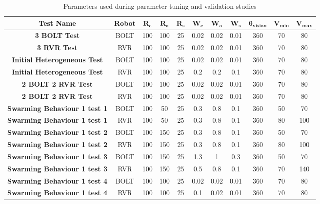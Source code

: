 \documentclass[conference]{IEEEtran}
\begin{document}
\begin{table} [htbp]
    \centering
    \caption{Parameters used during parameter tuning and validation studies}
    \begin{tabular}{|c|c|c|c|c|c|c|c|c|c|c|}
    \hline
        \textbf{Test Name} & \textbf{Robot} & $\mathbf{R_c}$ & $\mathbf{R_a}$ & $\mathbf{R_s}$ & $\mathbf{W_c}$ & $\mathbf{W_a}$ & $\mathbf{W_s}$ & $\mathbf{\theta_{vision}}$ & $\mathbf{V_{min}}$ & $\mathbf{V_{max}}$ \\ \hline
        \textbf{3 BOLT Test} & BOLT & 100 & 100 & 25 & 0.02 & 0.02 & 0.01 & 360 & 70 & 80 \\ \hline
        \textbf{3 RVR Test} & RVR & 100 & 100 & 25 & 0.02 & 0.02 & 0.01 & 360 & 70 & 80 \\ \hline
        \textbf{Initial Heterogeneous Test} & BOLT & 100 & 100 & 25 & 0.02 & 0.02 & 0.01 & 360 & 70 & 80 \\ \hline
        \textbf{Initial Heterogeneous Test} & RVR & 100 & 100 & 25 & 0.2 & 0.2 & 0.1 & 360 & 70 & 80 \\ \hline
        \textbf{2 BOLT 2 RVR Test} & BOLT & 100 & 100 & 25 & 0.02 & 0.02 & 0.01 & 360 & 70 & 80 \\ \hline
        \textbf{2 BOLT 2 RVR Test} & RVR & 100 & 100 & 25 & 0.02 & 0.02 & 0.01 & 360 & 70 & 80\\ \hline
        \textbf{Swarming Behaviour 1 test 1} & BOLT & 100 & 50 & 25 & 0.3 & 0.8 & 0.1 & 360 & 50 & 70 \\ \hline
        \textbf{Swarming Behaviour 1 test 1} & RVR & 100 & 50 & 25 & 0.3 & 0.8 & 0.1 & 360 & 80 & 100\\ \hline
        \textbf{Swarming Behaviour 1 test 2} & BOLT & 100 & 150 & 25 & 0.3 & 0.8 & 0.1 & 360 & 50 & 70\\ \hline
        \textbf{Swarming Behaviour 1 test 2} & RVR & 100 & 150 & 25 & 0.3 & 0.8 & 0.1 & 360 & 80 & 100\\ \hline
        \textbf{Swarming Behaviour 1 test 3} & BOLT & 100 & 150 & 25 & 1.3 & 1 & 0.3 & 360 & 50 & 70\\ \hline
        \textbf{Swarming Behaviour 1 test 3} & RVR & 100 & 150 & 25 & 0.5 & 0.8 & 0.1 & 360 & 70 & 140\\ \hline
        \textbf{Swarming Behaviour 1 test 4} & BOLT & 100 & 100 & 25 & 0.02 & 0.02 & 0.01 & 360 & 70 & 80\\ \hline
        \textbf{Swarming Behaviour 1 test 4} & RVR & 100 & 100 & 25 & 0.1 & 0.02 & 0.01 & 360 & 70 & 80\\ \hline

\end{tabular}
\end{table}
\end{document}
